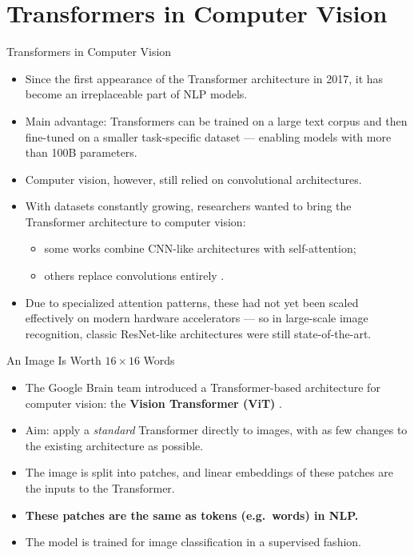 \section{Transformers in Computer Vision}

\begin{frame}{Transformers in Computer Vision}
\small%
\begin{itemize}
  \item Since the first appearance of the Transformer architecture in 2017, it has become an irreplaceable part of NLP models.
  \item Main advantage: Transformers can be trained on a large text corpus and then fine-tuned on a smaller task-specific dataset --- enabling models with more than 100B parameters.
  \item Computer vision, however, still relied on convolutional architectures.
  \item With datasets constantly growing, researchers wanted to bring the Transformer architecture to computer vision:
  \begin{itemize}
    \item some works combine CNN-like architectures with self-attention;
    \item others replace convolutions entirely .
  \end{itemize}
  \item Due to specialized attention patterns, these had not yet been scaled effectively on modern hardware accelerators --- so in large-scale image recognition, classic ResNet-like architectures were still state-of-the-art.
\end{itemize}
\end{frame}

\begin{frame}{An Image Is Worth $16\times16$ Words}
\begin{itemize}
  \item The Google Brain team introduced a Transformer-based architecture for computer vision: the \textbf{Vision Transformer (ViT)} .
  \item Aim: apply a \emph{standard} Transformer directly to images, with as few changes to the existing architecture as possible.
  \item The image is split into patches, and linear embeddings of these patches are the inputs to the Transformer.
  \item \textbf{These patches are the same as tokens (e.g.\ words) in NLP.}
  \item The model is trained for image classification in a supervised fashion.
\end{itemize}
\end{frame}


